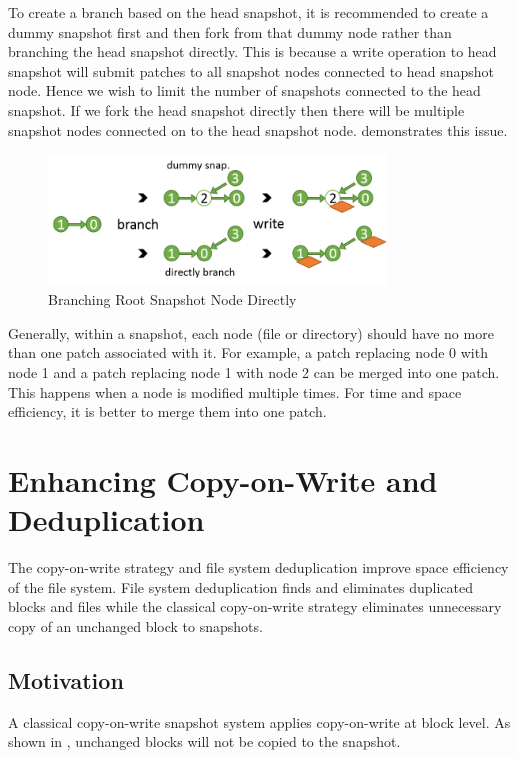    To create a branch based on the head snapshot, it is recommended to create a dummy snapshot first and then fork from that dummy node rather than branching the head snapshot directly. This is because a write operation to head snapshot will submit patches to all snapshot nodes connected to head snapshot node. Hence we wish to limit the number of snapshots connected to the head snapshot. If we fork the head snapshot directly then there will be multiple snapshot nodes connected on to the head snapshot node.  demonstrates this issue.

\begin{figure}[t]
\centering
\includegraphics[width=0.8\textwidth]{Chapter-4/figs/fig16.png}
\caption{Branching Root Snapshot Node Directly}
\label{fig:dummy_node}
\end{figure}

	Generally, within a snapshot, each node (file or directory) should have no more than one patch associated with it. For example, a patch replacing node 0 with node 1 and a patch replacing node 1 with node 2 can be merged into one patch. This happens when a node is modified multiple times. For time and space efficiency, it is better to merge them into one patch.
	
\section{Enhancing Copy-on-Write and Deduplication}

	The copy-on-write strategy and file system deduplication improve space efficiency of the file system. File system deduplication finds and eliminates duplicated blocks and files while the classical copy-on-write strategy eliminates unnecessary copy of an unchanged block to snapshots.

\subsection{Motivation}

    A classical copy-on-write snapshot system applies copy-on-write at block level. As shown in , unchanged blocks will not be copied to the snapshot.

